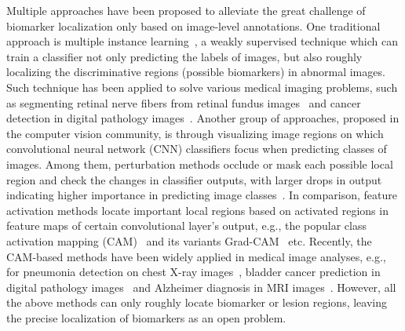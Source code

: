 \documentclass[runningheads]{llncs}
\begin{document}
Multiple approaches have been proposed to alleviate the great challenge of biomarker localization only based on image-level annotations. One traditional approach is multiple instance learning~\cite{maron1998framework}, a weakly supervised technique which can train a classifier not only predicting the labels of images, but also roughly localizing the discriminative regions (possible biomarkers) in abnormal images. Such technique has been applied to solve various medical imaging problems, such as segmenting retinal nerve fibers from retinal fundus images~\cite{Manivannan} and  cancer detection in digital pathology images~\cite{Melih}. Another group of approaches, proposed in the computer vision community, is through visualizing image regions on which convolutional neural network (CNN) classifiers focus when predicting classes of images. Among them, perturbation methods occlude or mask each possible local region and check the changes in classifier outputs, with larger drops in output indicating higher importance in predicting image classes~\cite{zintgraf2017visualizing}. 
In comparison, feature activation methods locate important local regions based on activated regions in feature maps of certain convolutional layer's output, e.g., the popular class activation mapping (CAM)~\cite{zhou2016learning} and its variants Grad-CAM~\cite{selvaraju2017grad} etc.
Recently, the CAM-based methods have been widely applied in medical image analyses, e.g., for pneumonia detection on chest X-ray images~\cite{rajpurkar2017chexnet}, bladder cancer prediction in digital pathology images~\cite{zhang2017mdnet} and Alzheimer diagnosis in MRI images~\cite{yang2018visual}.
However, all the above methods can only roughly locate biomarker or lesion regions, leaving the precise localization of biomarkers as an open problem.
\end{document}
